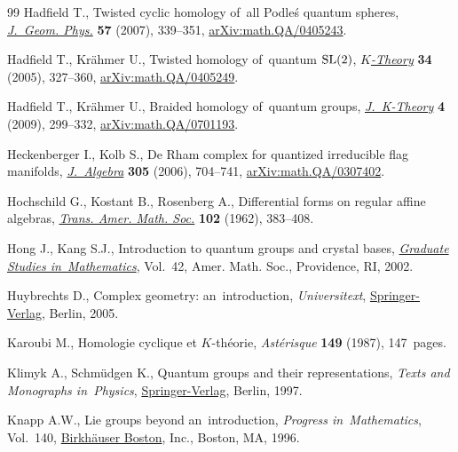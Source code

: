 \begin{thebibliography}{99}
Hadfield T., Twisted cyclic homology of~all {P}odle\'{s} quantum spheres,
 \href{https://doi.org/10.1016/j.geomphys.2006.03.006}{\textit{J.~Geom. Phys.}} \textbf{57} (2007), 339--351,
 \href{https://arxiv.org/abs/math.QA/0405243}{arXiv:math.QA/0405243}.

Hadfield T., Kr\"ahmer U., Twisted homology of~quantum {${\rm SL}(2)$},
 \href{https://doi.org/10.1007/s10977-005-3118-2}{\textit{$K$-Theory}} \textbf{34} (2005), 327--360, \href{https://arxiv.org/abs/math.QA/0405249}{arXiv:math.QA/0405249}.

Hadfield T., Kr\"ahmer U., Braided homology of~quantum groups,
 \href{https://doi.org/10.1017/is008008021jkt063}{\textit{J.~K-Theory}} \textbf{4} (2009), 299--332, \href{https://arxiv.org/abs/math.QA/0701193}{arXiv:math.QA/0701193}.

Heckenberger I., Kolb S., De {R}ham complex for quantized irreducible flag
 manifolds, \href{https://doi.org/10.1016/j.jalgebra.2006.02.001}{\textit{J.~Algebra}} \textbf{305} (2006), 704--741,
 \href{https://arxiv.org/abs/math.QA/0307402}{arXiv:math.QA/0307402}.

Hoch\-schild G., Kostant B., Rosenberg A., Differential forms on regular affine
 algebras, \href{https://doi.org/10.2307/1993614}{\textit{Trans. Amer. Math. Soc.}} \textbf{102} (1962), 383--408.

Hong J., Kang S.J., Introduction to quantum groups and crystal bases,
 \href{https://doi.org/10.1090/gsm/042}{\textit{Graduate Studies in~Mathematics}}, Vol.~42, Amer. Math. Soc.,
 Providence, RI, 2002.

Huybrechts D., Complex geometry: an~introduction, \textit{Universitext},
 \href{https://doi.org/10.1007/b137952}{Springer-Verlag}, Berlin, 2005.

Karoubi M., Homologie cyclique et {$K$}-th\'eorie, \textit{Ast\'erisque}
 \textbf{149} (1987), 147~pages.

Klimyk A., Schm\"udgen K., Quantum groups and their representations, \textit{Texts and
 Monographs in~Physics}, \href{https://doi.org/10.1007/978-3-642-60896-4}{Springer-Verlag}, Berlin, 1997.

Knapp A.W., Lie groups beyond an~introduction, \textit{Progress in~Mathematics}, Vol.~140, \href{https://doi.org/10.1007/978-1-4757-2453-0}{Birkh\"auser Boston}, Inc., Boston, MA, 1996.


\end{thebibliography}
